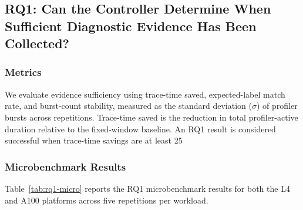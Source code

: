 \subsection{RQ1: Can the Controller Determine When Sufficient Diagnostic Evidence Has Been Collected?}

\subsubsection{Metrics}

We evaluate evidence sufficiency using trace-time saved, expected-label match rate, and burst-count stability, measured as the standard deviation ($\sigma$) of profiler bursts across repetitions. Trace-time saved is the reduction in total profiler-active duration relative to the fixed-window baseline. An RQ1 result is considered successful when trace-time savings are at least 25%

\subsubsection{Microbenchmark Results}

Table~\ref{tab:rq1-micro} reports the RQ1 microbenchmark results for both the L4 and A100 platforms across five repetitions per workload.

\begin{table}[h]
\centering
\caption{RQ1 microbenchmark results: automatic vs.\ fixed-window profiler duration (mean over 5 repetitions). All rows pass the combined success criterion.}
\label{tab:rq1-micro}
\end{table}

